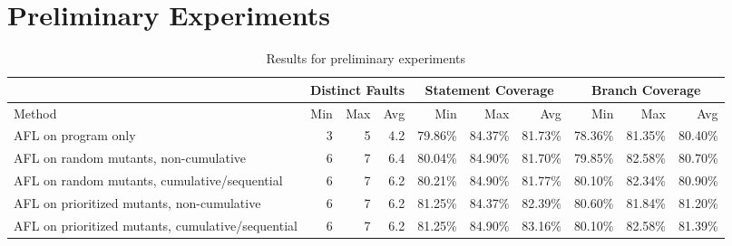 \section{Preliminary Experiments}

\begin{table*}
  \begin{centering}
  \begin{tabular}{l||r|r|r||r|r|r||r|r|r}
    & \multicolumn{3}{|c||}{Distinct Faults} & \multicolumn{3}{|c||}{Statement Coverage} &
                                                                    \multicolumn{3}{|c}{Branch Coverage} \\
    \hline
  Method & Min & Max  & Avg & Min & Max & Avg
                                                                  
  & Min & Max & Avg \\
    \hline
    \hline
  AFL on program only & 3 & 5 & 4.2 & 79.86\% & 84.37\% & 81.73\% &
                                                                    78.36\%
                                  & 81.35\% & 80.40\%\\
    \hline
    \hline
  AFL on random mutants, non-cumulative  & 6 & 7 & 6.4 & 80.04\% &
                                                                   84.90\%
                      & 81.70\% & 79.85\% & 82.58\% & 80.70\%\\
  \hline
  AFL on random mutants, cumulative/sequential & 6 & 7 & 6.2 & 80.21\%
                                                               &
                                                                 84.90\%
                      & 81.77\%
                            & 80.10\% & 82.34\% & 80.90\%\\
    \hline
    \hline
    AFL on prioritized mutants, non-cumulative  & 6 & 7 & 6.2 &
                                                                81.25\%
               & 84.37\% & 82.39\% & 80.60\% & 81.84\% & 81.20\% \\
    \hline
    AFL on prioritized mutants, cumulative/sequential  & 6 & 7 & 6.2 &
    81.25\% & 84.90\% & 83.16\% & 80.10\% & 82.58\% & 81.39\%\\    
  \hline
  \end{tabular}
\end{centering}
\label{tab:prelim}
\caption{Results for preliminary experiments}
\end{table*}

